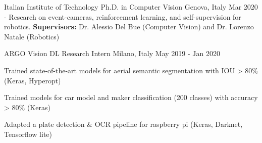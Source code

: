 

\begin{cventries}
  \cventry
{Italian Institute of Technology} %
{Ph.D.  in Computer Vision} %
{Genova, Italy} %
{Mar 2020 -} %
{Research on event-cameras, reinforcement learning, and self-supervision for robotics. \linebreak \textbf{Supervisors:} Dr. Alessio Del Bue (Computer Vision) and Dr. Lorenzo Natale (Robotics)}


  \cventry
  {ARGO Vision} %
  {DL Research Intern} %
  {Milano, Italy} %
  {May 2019 - Jan 2020} %
  {
    \begin{cvitems} %
    \item Trained state-of-the-art models for aerial semantic segmentation  with IOU > 80\% (Keras, Hyperopt)
    \item Trained models for car model and maker classification (200 classes) with accuracy > 80\%   (Keras)
    \item Adapted a plate detection \& OCR pipeline for raspberry pi (Keras, Darknet, Tensorflow lite)
    \end{cvitems}
  }


\end{cventries}
